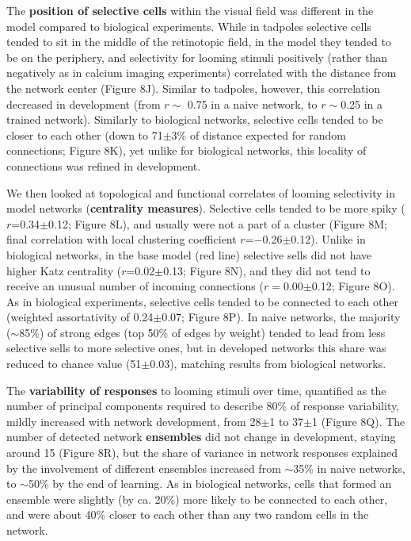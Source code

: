 \documentclass{article}
\begin{document}
The \textbf{position of selective cells} within the visual field was different in the model compared to biological experiments. While in tadpoles selective cells tended to sit in the middle of the retinotopic field, in the model they tended to be on the periphery, and selectivity for looming stimuli positively (rather than negatively as in calcium imaging experiments) correlated with the distance from the network center (Figure 8J). Similar to tadpoles, however, this correlation decreased in development (from $r\sim$ 0.75 in a naive network, to $r\sim$0.25 in a trained network). Similarly to biological networks, selective cells tended to be closer to each other (down to 71$\pm$3\% of distance expected for random connections; Figure 8K), yet unlike for biological networks, this locality of connections was refined in development.

We then looked at topological and functional correlates of looming selectivity in model networks (\textbf{centrality measures}). Selective cells tended to be more spiky ($r$=0.34$\pm$0.12; Figure 8L), and usually were not a part of a cluster (Figure 8M; final correlation with local clustering coefficient $r$=$-$0.26$\pm$0.12). Unlike in biological networks, in the base model (red line) selective sells did not have higher Katz centrality ($r$=0.02$\pm$0.13; Figure 8N), and they did not tend to receive an unusual number of incoming connections ($r=$0.00$\pm$0.12; Figure 8O). As in biological experiments, selective cells tended to be connected to each other (weighted assortativity of 0.24$\pm$0.07; Figure 8P). In naive networks, the majority ($\sim$85\%) of strong edges (top 50\% of edges by weight) tended to lead from less selective sells to more selective ones, but in developed networks this share was reduced to chance value (51$\pm$0.03), matching results from biological networks.

The \textbf{variability of responses} to looming stimuli over time, quantified as the number of principal components required to describe 80\% of response variability, mildly increased with network development, from 28$\pm$1 to 37$\pm$1 (Figure 8Q). The number of detected network \textbf{ensembles} did not change in development, staying around 15 (Figure 8R), but the share of variance in network responses explained by the involvement of different ensembles increased from $\sim$35\% in naive networks, to $\sim$50\% by the end of learning. As in biological networks, cells that formed an ensemble were slightly (by ca. 20\%) more likely to be connected to each other, and were about 40\% closer to each other than any two random cells in the network.
\end{document}
